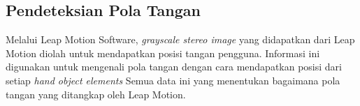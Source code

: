	\subsection{Pendeteksian Pola Tangan}
	\vspace{1ex}
		Melalui Leap Motion Software, \textit{grayscale stereo image} yang didapatkan dari Leap Motion diolah untuk mendapatkan posisi tangan pengguna. Informasi ini digunakan untuk mengenali pola tangan dengan cara mendapatkan posisi dari setiap \textit{hand object elements} %
		Semua data ini yang menentukan bagaimana pola tangan yang ditangkap oleh Leap Motion.

		
